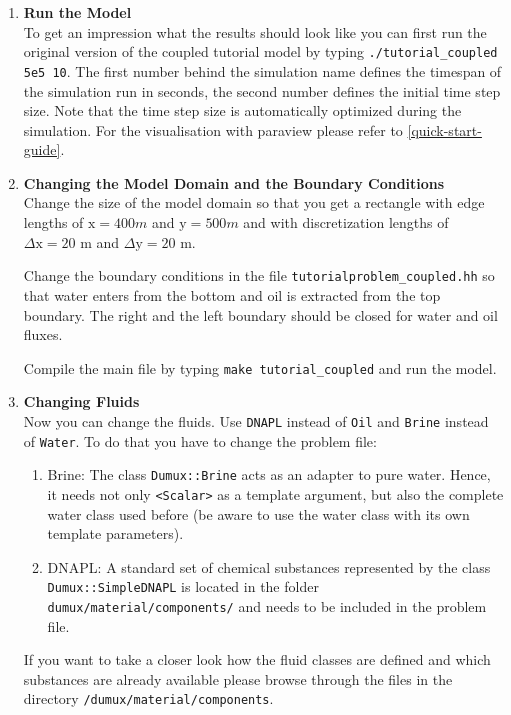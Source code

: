 \begin{enumerate}

\item \textbf{Run the Model} \\
To get an impression what the results should look like you can first run the original version of the coupled tutorial model by typing  \texttt{./tutorial\_coupled 5e5 10}. The first number behind the simulation name defines the timespan of the simulation run in seconds, the second number defines the initial time step size. Note that the time step size is automatically optimized during the simulation. For the visualisation with paraview please refer to \ref{quick-start-guide}.\\

\item \textbf{Changing the Model Domain and the Boundary Conditions} \\
  Change the size of the model domain so that you get a rectangle with
  edge lengths of $\text{x} = 400 m$ and $\text{y} = 500 m$ and with
  discretization lengths of $\Delta \text{x} = 20$ m and $\Delta
  \text{y} = 20$ m.
  
  Change the boundary conditions in the file
  \texttt{tutorialproblem\_coupled.hh} so that water enters from the
  bottom and oil is extracted from the top boundary. The right and the
  left boundary should be closed for water and oil fluxes. 

  Compile the main file by typing \texttt{make tutorial\_coupled} and
  run the model.


\item \textbf{Changing Fluids} \\
  Now you can change the fluids. Use \texttt{DNAPL} instead of
  \texttt{Oil} and \texttt{Brine} instead of \texttt{Water}. To do
  that you have to change the problem file:
  \begin{enumerate}
  \item Brine: The class \texttt{Dumux::Brine} acts as an adapter to pure water. Hence, it needs not only \texttt{<Scalar>} as a template argument, but also the complete water class used before (be aware to use the water class with its own template parameters).
 \item DNAPL: A standard set of chemical substances represented by the class \texttt{Dumux::SimpleDNAPL} is located in the folder \texttt{dumux/material/components/} and needs to be included in the problem file.
\end{enumerate}
  If you want to take a closer look how the fluid classes are defined 
  and which substances are already available please browse through the files in the directory
  \texttt{/dumux/material/components}.


\end{enumerate}

